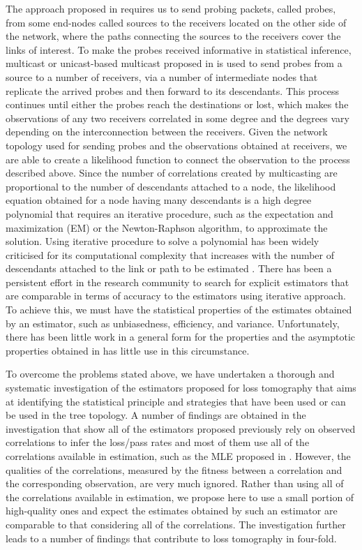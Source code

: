 \documentclass[10pt,onecolumn]{IEEEtran}
\begin{document}
The approach proposed in \cite{YV96} requires us to send probing packets, called probes, from some end-nodes called sources  to the
receivers located on the other side of the network, where the paths
connecting the sources to the receivers cover the links of interest. To make the probes received informative in statistical inference,
 multicast or unicast-based multicast proposed in \cite{HBB00,CN00}  is used to send probes from a source to a number of receivers, via a number of intermediate nodes that replicate the arrived probes and then forward to its descendants. This process continues until either the probes reach the destinations or lost, which makes the observations of any two receivers correlated in some degree and the degrees vary depending on the interconnection between the receivers.  Given the network topology used for sending probes and the observations obtained at receivers, we are able to create a likelihood function to connect the observation  to the process described above. 
 Since the number of correlations created by multicasting are proportional to the number of descendants attached to a node, the likelihood equation obtained for a node having many descendants is a high degree polynomial that requires an iterative procedure, such as  the expectation and maximization (EM) or the Newton-Raphson algorithm, to approximate the solution. Using iterative procedure to solve a polynomial has been widely criticised  for its computational complexity that increases with the number of descendants attached to the link or path to be estimated \cite{CN00}.  There has been a persistent effort in the research community to search for explicit estimators that are comparable in terms of accuracy to the estimators using iterative approach.  To achieve this, we must have the statistical properties of the estimates obtained by an estimator, such as unbiasedness, efficiency, and variance. Unfortunately, there has been little work in a general form for the properties and the asymptotic properties obtained in \cite{CDHT99, DHPT06} has little use in this circumstance.

  To overcome the problems stated above,   we have undertaken a thorough and systematic investigation of the estimators proposed for loss tomography that aims at identifying the statistical principle and strategies that have been used or can be used in the tree topology. A number of findings are obtained in the investigation that show all of the estimators proposed previously  rely on observed correlations to infer the loss/pass rates and most of them use all of the correlations available in estimation, such as the MLE  proposed in \cite{CDHT99}. However, the qualities of the correlations, measured by the fitness between a correlation and the corresponding observation, are very much ignored. Rather than using all of the correlations available in estimation, we propose here to use a small portion of high-quality ones and expect the estimates obtained by such an estimator are comparable to that considering all of the correlations.  The investigation further leads to a number of findings that contribute to loss tomography in four-fold.
\end{document}
